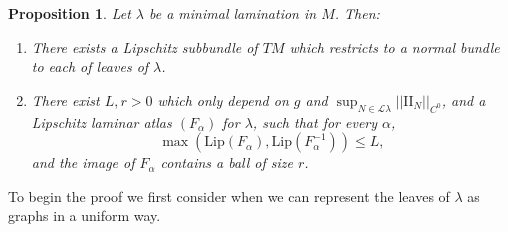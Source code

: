 \documentclass[reqno,11pt]{amsart}
\newcommand{\Leaves}{\mathscr L}
\newcommand{\Two}{\mathrm{I\!I}}
\newcommand{\Lip}{\mathrm{Lip}}
\newtheorem{proposition}[theorem]{Proposition}
\theoremstyle{definition}
\numberwithin{equation}{section}
\begin{document}
\begin{proposition}\label{regularity theorem}
Let $\lambda$ be a minimal lamination in $M$. Then:
\begin{enumerate}
\item There exists a Lipschitz subbundle of $TM$ which restricts to a normal bundle to each of leaves of $\lambda$.
\item There exist $L, r > 0$ which only depend on $g$ and $\sup_{N \in \Leaves \lambda} ||\Two_N||_{C^0}$, and a Lipschitz laminar atlas $(F_\alpha)$ for $\lambda$, such that for every $\alpha$,
\begin{equation}\label{conorm of flow box}
	\max(\Lip(F_\alpha), \Lip(F_\alpha^{-1})) \leq L,
\end{equation}
and the image of $F_\alpha$ contains a ball of size $r$.
\end{enumerate}
\end{proposition}

To begin the proof we first consider when we can represent the leaves of $\lambda$ as graphs in a uniform way.
\end{document}
